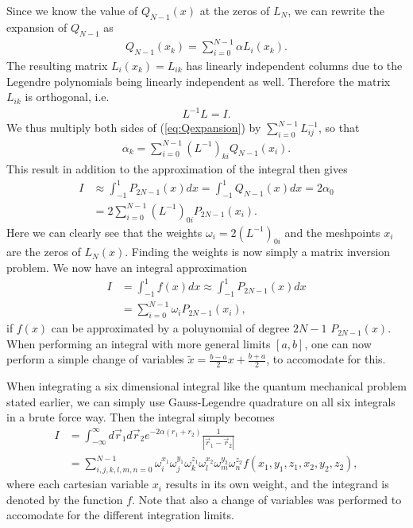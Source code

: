 \documentclass[twocolumn]{aastex62}
\begin{document}
Since we know the value of $Q_{N-1}(x)$ at the zeros of $L_N$, we can rewrite the expansion of $Q_{N-1}$ as
\begin{align}
	Q_{N-1} (x_k)= \sum^{N-1}_{i=0} \alpha L_i(x_k).
	\label{eq:Qexpansion}
\end{align}
The resulting matrix $L_i(x_k) = L_{ik}$ has linearly independent columns due to the Legendre polynomials being linearly independent as well. Therefore the matrix $L_{ik}$ is orthogonal, i.e.
\begin{align}
	L^{-1}L = I.
\end{align}
We thus multiply both sides of (\ref{eq:Qexpansion}) by $\sum^{N-1}_{i=0}L^{-1}_{ij}$, so that 
\begin{align}
	\alpha_k = \sum_{i=0}^{N-1} (L^{-1})_{ki}Q_{N-1}(x_i).
\end{align}
This result in addition to the approximation of the integral then gives
\begin{align}
	I &\approx \int^1_{-1} P_{2N-1}(x)dx = \int^1_{-1} Q_{N-1}(x)dx = 2\alpha_0 \\
	&= 2 \sum^{N-1}_{i=0} (L^{-1})_{0i}P_{2N-1}(x_i).
\end{align}
Here we can clearly see that the weights $\omega_i = 2(L^{-1})_{0i}$ and the meshpoints $x_i$ are the zeros of $L_N(x)$. Finding the weights is now simply a matrix inversion problem.
We now have an integral approximation
\begin{align}
	I &= \int^1_{-1} f(x) dx \approx \int^1_{-1} P_{2N-1}(x)dx\\
	 &= \sum^{N-1}_{i=0}\omega_iP_{2N-1}(x_i), 
\end{align}
if $f(x)$ can be approximated by a poluynomial of degree $2N-1$ $P_{2N-1}(x)$. When performing an integral with more general limits $[a,b]$, one can now perform a simple change of variables $\tilde{x} = \frac{b - a}{2}x + \frac{b + a}{2}$, to accomodate for this.

When integrating a six dimensional integral like the quantum mechanical problem stated earlier, we can simply use Gauss-Legendre quadrature on all six integrals in a brute force way. Then the integral simply becomes 
\begin{align}
	I &= \int^\infty_{-\infty} d\vec{r}_1d\vec{r}_2 e^{-2\alpha(r_1 + r_2)}\frac{1}{|\vec{r}_1 - \vec{r}_2|} \\
	&= \sum_{i, j, k, l, m, n = 0}^{N-1} \omega^{x_1}_i \omega^{y_1}_j \omega^{z_1}_k \omega^{x_2}_l \omega^{y_2}_m \omega^{z_2}_n f(x_1, y_1, z_1, x_2, y_2, z_2),
\end{align} 
where each cartesian variable $x_i$ results in its own weight, and the integrand is denoted by the function $f$. Note that also a change of variables was performed to accomodate for the different integration limits.
\end{document}
